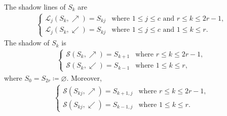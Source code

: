 \documentclass[10pt,a4paper]{amsart}
\begin{document}
\begin{lemma}\label{lem:proof-shadows}
    The shadow lines of $S_k$ are
    \begin{align*}
    \begin{cases}
        \mathcal{L}_j(S_k, \nearrow) = S_{kj}
          & \text{where }1 \leq j \leq c\text{ and }r \leq k \leq 2r-1, \\
        \mathcal{L}_j(S_k, \swarrow) = S_{kj}
          & \text{where }1 \leq j \leq c\text{ and }1 \leq k \leq r.
    \end{cases}
    \end{align*}
    The shadow of $S_k$ is
    \begin{align*}
    \begin{cases}
        \mathcal{S}(S_k, \nearrow) = S_{k+1}
          & \text{where }r \leq k \leq 2r-1, \\
        \mathcal{S}(S_k, \swarrow) = S_{k-1}
          & \text{where }1 \leq k \leq r,
    \end{cases}
    \end{align*}
    where $S_0 = S_{2r} \coloneqq \varnothing$. Moreover,
    \begin{align*}
    \begin{cases}
        \mathcal{S}(S_{kj}, \nearrow) = S_{k+1,j}
          & \text{where }r \leq k \leq 2r-1, \\
        \mathcal{S}(S_{kj}, \swarrow) = S_{k-1,j}
          & \text{where }1 \leq k \leq r.
    \end{cases}
    \end{align*}
\end{lemma}
\end{document}
